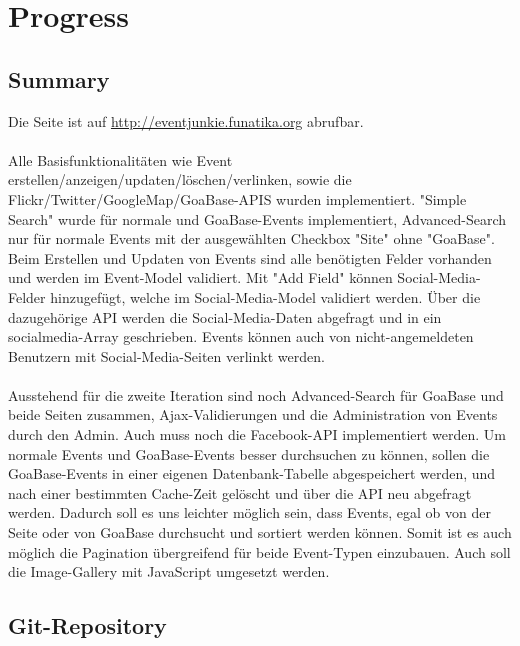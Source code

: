 \documentclass{article}
\begin{document}
\begin{titlepage}
\end{titlepage}

\tableofcontents

\pagebreak

\section{Progress}
\subsection{Summary}

Die Seite ist auf 
\href{http://eventjunkie.funatika.org}{http://eventjunkie.funatika.org} abrufbar.\\ \\
Alle Basisfunktionalitäten wie Event erstellen/anzeigen/updaten/löschen/verlinken, sowie die Flickr/Twitter/GoogleMap/GoaBase-APIS wurden implementiert. "Simple Search" wurde für normale und GoaBase-Events implementiert, Advanced-Search nur für normale Events mit der ausgewählten Checkbox "Site" ohne "GoaBase". Beim Erstellen und Updaten von Events sind alle benötigten Felder vorhanden und werden im Event-Model validiert. Mit "Add Field" können Social-Media-Felder hinzugefügt, welche im Social-Media-Model validiert werden. Über die dazugehörige API werden die Social-Media-Daten abgefragt und in ein socialmedia-Array geschrieben. Events können auch von nicht-angemeldeten Benutzern mit Social-Media-Seiten verlinkt werden.
\\ \\
Ausstehend für die zweite Iteration sind noch Advanced-Search für GoaBase und beide Seiten zusammen, Ajax-Validierungen und die Administration von Events durch den Admin.
Auch muss noch die Facebook-API implementiert werden. Um normale Events und GoaBase-Events besser durchsuchen zu können, sollen die GoaBase-Events in einer eigenen Datenbank-Tabelle abgespeichert werden, und nach einer bestimmten Cache-Zeit gelöscht und über die
API neu abgefragt werden. Dadurch soll es uns leichter möglich sein, dass Events, egal ob von der Seite oder von GoaBase durchsucht und sortiert werden können. Somit ist es auch möglich die Pagination übergreifend für beide Event-Typen einzubauen. Auch soll die Image-Gallery mit JavaScript umgesetzt werden.

\subsection{Git-Repository}
\end{document}
